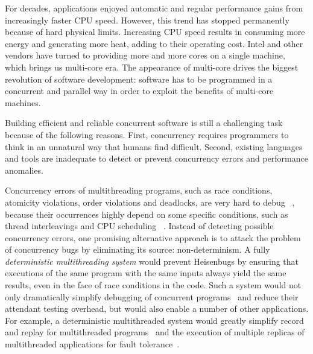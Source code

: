 For decades, applications enjoyed automatic and regular performance gains from increasingly faster CPU speed.  However, this trend has stopped permanently because of hard physical limits. Increasing CPU speed results in consuming more energy and generating more heat, adding to their operating cost. Intel and other vendors have turned to providing more and more cores on a single machine, which brings us multi-core era. The appearance of multi-core drives the biggest revolution of software development: software has to be programmed in a concurrent and parallel way in order to exploit the benefits of multi-core machines.

Building efficient and reliable concurrent software is still a challenging task because of the following reasons. First, concurrency requires programmers to think in an unnatural way that humans find difficult.  Second, existing languages and tools are inadequate to detect or prevent concurrency errors and performance anomalies. 

Concurrency errors of multithreading programs, such as race conditions, atomicity violations, order violations and deadlocks, are very hard to debug ~\cite{Lu:2008:LMC:1346281.1346323}, because their occurrences highly depend on some specific conditions, such as thread interleavings and CPU scheduling ~\cite{DBLP:conf/icse/BallBHMQ09,DBLP:conf/asplos/BurckhardtKMN10}. Instead of detecting possible concurrency errors, one promising alternative approach is to attack the problem of concurrency bugs by eliminating its source: non-determinism. A fully \emph{deterministic multithreading system} would prevent Heisenbugs by ensuring that executions of the same program with the same inputs always yield the same results, even in the face of race conditions in the code. Such a system would not only dramatically simplify debugging of concurrent
programs~\cite{Carver:1991:RTC:624586.625040} and reduce their attendant testing overhead, but would also enable a number of other applications. For example, a deterministic multithreaded system would greatly simplify record and replay for multithreaded programs~\cite{Choi:1998:DRJ:281035.281041,LeBlanc:1987:DPP:32387.32396} and the execution of multiple replicas of multithreaded applications for fault tolerance~\cite{deterministic-process-groups,1134000,224058,replicant-hotos}.

